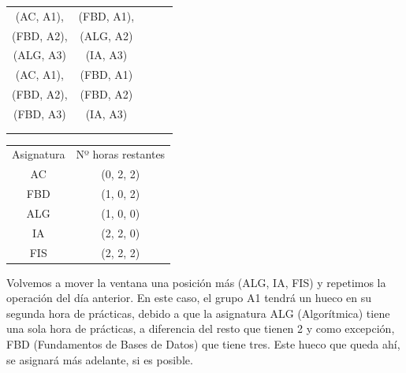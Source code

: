 \begin{minipage}{0.5\textwidth}    
\begin{tabular}{| c | c | c | c | c |}
\hline
 (AC, A1), & (FBD, A1), &  &  & \\
 (FBD, A2), & (ALG, A2) &  &  & \\
 (ALG, A3) &  (IA, A3) &  &  & \\
 \hline
 (AC, A1), & (FBD, A1) &  &  & \\
 (FBD, A2), & (FBD, A2) &  &  & \\
 (FBD, A3) & (IA, A3) &  &  & \\
 \hline
 &  &  &  & \\
 \hline
 &  &  &  & \\
 \hline 
\end{tabular}
\end{minipage}
\begin{minipage}{0.5\textwidth}
\begin{tabular}{c | c}
Asignatura & Nº horas restantes \\
AC & (0, 2, 2) \\
FBD & (1, 0, 2) \\
ALG & (1, 0, 0) \\
IA & (2, 2, 0) \\
FIS & (2, 2, 2)
\end{tabular}
\end{minipage}

Volvemos a mover la ventana una posición más (ALG, IA, FIS) y repetimos la operación del día anterior. En este caso, el grupo A1 tendrá un hueco en su segunda hora de prácticas, debido a que la asignatura ALG (Algorítmica) tiene una sola hora de prácticas, a diferencia del resto que tienen 2 y como excepción, FBD (Fundamentos de Bases de Datos) que tiene tres. Este hueco que queda ahí, se asignará más adelante, si es posible.

